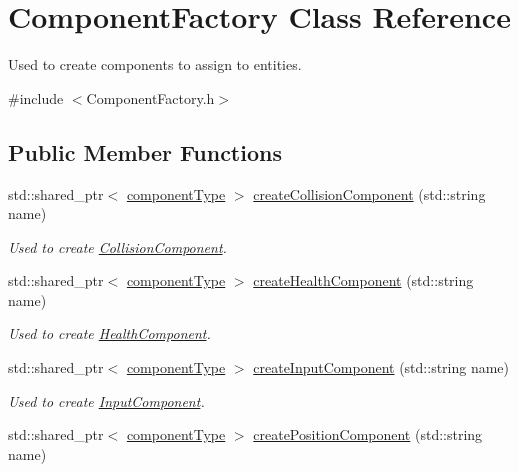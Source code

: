 \hypertarget{class_component_factory}{\section{Component\-Factory Class Reference}
\label{db/d28/class_component_factory}
}


Used to create components to assign to entities.  




{\ttfamily \#include $<$Component\-Factory.\-h$>$}

\subsection*{Public Member Functions}
\begin{DoxyCompactItemize}
\item 
std\-::shared\-\_\-ptr$<$ \hyperlink{_abstract_component_8h_a2fb71c745bae7eefb130b6bd26fec141}{component\-Type} $>$ \hyperlink{class_component_factory_a535bb905fc8bebd51ea0ba422a9a60c2}{create\-Collision\-Component} (std\-::string name)
\begin{DoxyCompactList}\small\item\em Used to create \hyperlink{class_collision_component}{Collision\-Component}. \end{DoxyCompactList}\item 
std\-::shared\-\_\-ptr$<$ \hyperlink{_abstract_component_8h_a2fb71c745bae7eefb130b6bd26fec141}{component\-Type} $>$ \hyperlink{class_component_factory_aabec687e57b5ab4b1125f32508d38188}{create\-Health\-Component} (std\-::string name)
\begin{DoxyCompactList}\small\item\em Used to create \hyperlink{class_health_component}{Health\-Component}. \end{DoxyCompactList}\item 
std\-::shared\-\_\-ptr$<$ \hyperlink{_abstract_component_8h_a2fb71c745bae7eefb130b6bd26fec141}{component\-Type} $>$ \hyperlink{class_component_factory_aa48a8044f5c65738dcfbca91dd840c5c}{create\-Input\-Component} (std\-::string name)
\begin{DoxyCompactList}\small\item\em Used to create \hyperlink{class_input_component}{Input\-Component}. \end{DoxyCompactList}\item 
std\-::shared\-\_\-ptr$<$ \hyperlink{_abstract_component_8h_a2fb71c745bae7eefb130b6bd26fec141}{component\-Type} $>$ \hyperlink{class_component_factory_a4678e34498f26e608da37f8497e07ced}{create\-Position\-Component} (std\-::string name)

\end{DoxyCompactItemize}
